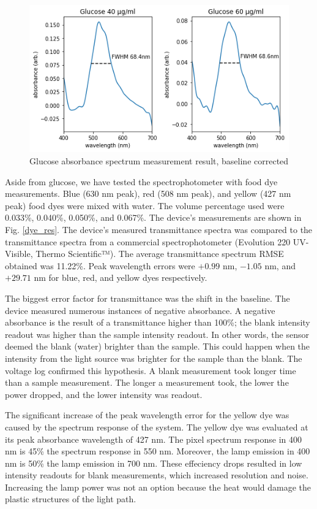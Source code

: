 \documentclass[conference]{IEEEtran}
\begin{document}
    \begin{figure}[htbp]
    \centerline{\includegraphics[scale=0.5]{glucose-res.png}}
    \caption{Glucose absorbance spectrum measurement result, baseline corrected}
    \label{glucose_result}
    \end{figure}

Aside from glucose, we have tested the spectrophotometer with food dye measurements.
Blue (630 nm peak), red (508 nm peak), and yellow (427 nm peak) food dyes were mixed with water.
The volume percentage used were 0.033\%, 0.040\%, 0.050\%, and 0.067\%.
The device's measurements are shown in Fig. \ref{dye_res}.
The device's measured transmittance spectra was compared to the transmittance spectra from a commercial spectrophotometer (Evolution 220 UV-Visible, Thermo Scientific™).
The average transmittance spectrum RMSE obtained was 11.22\%.
Peak wavelength errors were $+0.99$ nm, $-1.05$ nm, and $+29.71$ nm for blue, red, and yellow dyes respectively.

The biggest error factor for transmittance was the shift in the baseline.
The device measured numerous instances of negative absorbance.
A negative absorbance is the result of a transmittance higher than 100\%; the blank intensity readout was higher than the sample intensity readout.
In other words, the sensor deemed the blank (water) brighter than the sample.
This could happen when the intensity from the light source was brighter for the sample than the blank.
The voltage log confirmed this hypothesis.
A blank measurement took longer time than a sample measurement.
The longer a measurement took, the lower the power dropped, and the lower intensity was readout.

The significant increase of the peak wavelength error for the yellow dye was caused by the spectrum response of the system.
The yellow dye was evaluated at its peak absorbance wavelength of 427 nm.
The pixel spectrum response in 400 nm is 45\% the spectrum response in 550 nm.
Moreover, the lamp emission in 400 nm is 50\% the lamp emission in 700 nm.
These effeciency drops resulted in low intensity readouts for blank measurements, which increased resolution and noise.
Increasing the lamp power was not an option because the heat would damage the plastic structures of the light path. 
\end{document}
